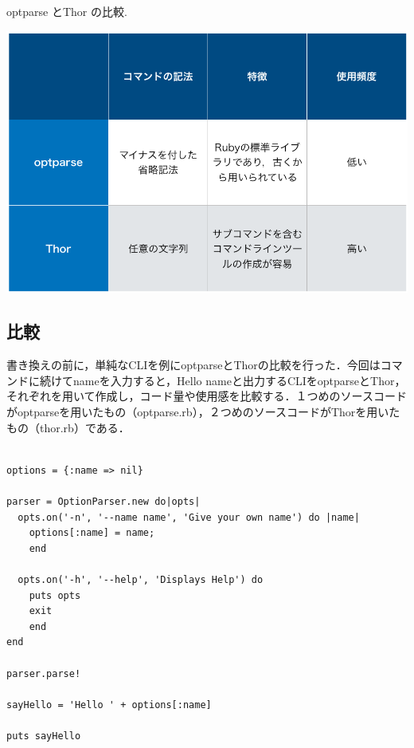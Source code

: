 \begin{table}[H]
\centering
\begin{center}
\caption{optparse とThor の比較. \label{opt_thor}}
\includegraphics[width=150mm]{../.././figs/opt_thor.png}
\end{center}


\label{fig:This}
\end{table}

\subsection{比較}\label{}

書き換えの前に，単純なCLIを例にoptparseとThorの比較を行った．今回はコマンドに続けてnameを入力すると，Hello nameと出力するCLIをoptparseとThor，それぞれを用いて作成し，コード量や使用感を比較する．１つめのソースコードがoptparseを用いたもの（optparse.rb），２つめのソースコードがThorを用いたもの（thor.rb）である．

\begin{screen}
{\small
\begin{verbatim}

options = {:name => nil}

parser = OptionParser.new do|opts|
  opts.on('-n', '--name name', 'Give your own name') do |name|
    options[:name] = name;
    end

  opts.on('-h', '--help', 'Displays Help') do
    puts opts
    exit
    end
end

parser.parse!

sayHello = 'Hello ' + options[:name]

puts sayHello

\end{verbatim}}
\end{screen}

